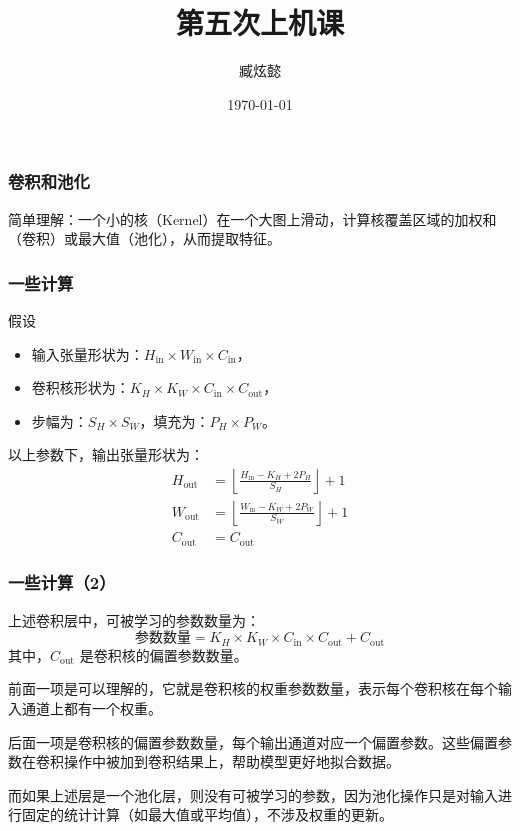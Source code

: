 \documentclass[fontset=none]{ctexbeamer}
\title{第五次上机课}
\author{臧炫懿}
\date{\today}
\begin{document}
\frame{\maketitle}

\begin{frame}
    \frametitle{卷积和池化}

    简单理解：一个小的核（Kernel）在一个大图上滑动，计算核覆盖区域的加权和（卷积）或最大值（池化），从而提取特征。

\end{frame}

\begin{frame}
    \frametitle{一些计算}

    假设
    \begin{itemize}
        \item 输入张量形状为：$H_\text{in} \times W_\text{in} \times C_\text{in}$，
        \item 卷积核形状为：$K_H \times K_W \times C_\text{in} \times C_\text{out}$，
        \item 步幅为：$S_H \times S_W$，填充为：$P_H \times P_W$。
    \end{itemize}

    以上参数下，输出张量形状为：
\begin{align}
H_\text{out} &= \left\lfloor \frac{H_\text{in} - K_H + 2P_H}{S_H} \right\rfloor + 1 \\
W_\text{out} &= \left\lfloor \frac{W_\text{in} - K_W + 2P_W}{S_W} \right\rfloor + 1 \\
C_\text{out} &= C_\text{out}
\end{align}

\end{frame}

\begin{frame}
    \frametitle{一些计算（2）}

    上述卷积层中，可被学习的参数数量为：
\begin{equation}
\text{参数数量} = K_H \times K_W \times C_\text{in} \times C_\text{out} + C_\text{out}
\end{equation}
其中，$C_\text{out}$ 是卷积核的偏置参数数量。

前面一项是可以理解的，它就是卷积核的权重参数数量，表示每个卷积核在每个输入通道上都有一个权重。

后面一项是卷积核的偏置参数数量，每个输出通道对应一个偏置参数。这些偏置参数在卷积操作中被加到卷积结果上，帮助模型更好地拟合数据。

而如果上述层是一个池化层，则没有可被学习的参数，因为池化操作只是对输入进行固定的统计计算（如最大值或平均值），不涉及权重的更新。

\end{frame}
\end{document}

